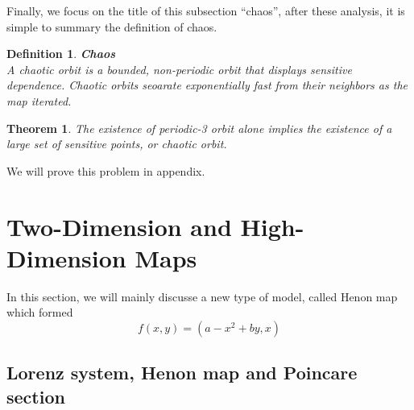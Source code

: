 \documentclass[12pt]{article}
\theoremstyle{plain}
\newtheorem{theorem}{\textbf{Theorem}}[section]
\newtheorem{definition}{\textbf{Definition}}[section]
\begin{document}
Finally, we focus on the title of this subsection ``chaos'', after these analysis, it is simple to summary the definition of chaos.

\begin{definition}\textbf{Chaos}
\\\noindent A chaotic orbit is a bounded, non-periodic orbit that displays sensitive dependence. Chaotic orbits seoarate exponentially fast from their neighbors as the map iterated.
\end{definition}


\begin{theorem} \label{p3-chaos}The existence of periodic-3 orbit alone implies the existence of a large set of sensitive points, or chaotic orbit.
\end{theorem}

We will prove this problem in appendix.

\newpage















\section{Two-Dimension and High-Dimension Maps}

In this section, we will mainly discusse a new type of model, called Henon map which formed
$$
f(x, y) = (a - x^2 + by, x) 
$$

\subsection{Lorenz system, Henon map and Poincare section}
\end{document}
